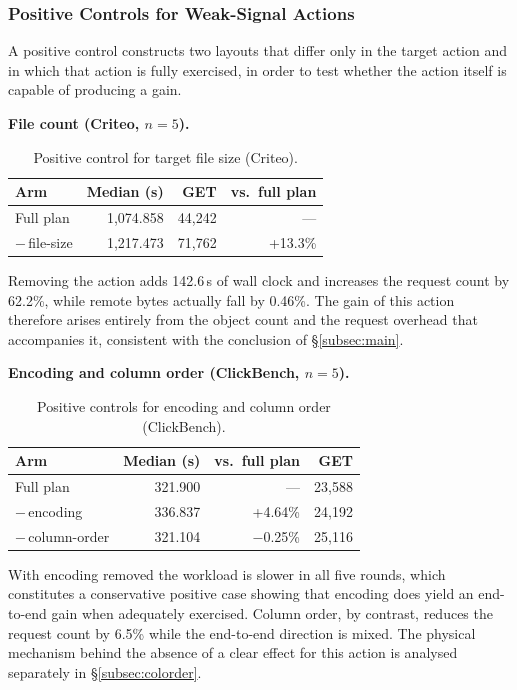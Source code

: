 \subsubsection{Positive Controls for Weak-Signal Actions}
\label{subsec:posctrl}

A positive control constructs two layouts that differ only in the target action
and in which that action is fully exercised, in order to test whether the action
itself is capable of producing a gain.

\textbf{File count (Criteo, $n=5$).}

\begin{table}[t]
\centering
\caption{Positive control for target file size (Criteo).}
\label{tab:posctrl_file}
\footnotesize
\begin{tabular}{@{}lrrr@{}}
\toprule
Arm & Median (s) & GET & vs.\ full plan \\
\midrule
Full plan          & 1{,}074.858 & 44{,}242 & ---      \\
$-$\,file-size     & 1{,}217.473 & 71{,}762 & +13.3\%  \\
\bottomrule
\end{tabular}
\end{table}

Removing the action adds 142.6\,s of wall clock and increases the request count
by 62.2\%, while remote bytes actually fall by 0.46\%. The gain of this action
therefore arises entirely from the object count and the request overhead that
accompanies it, consistent with the conclusion of \S\ref{subsec:main}.

\textbf{Encoding and column order (ClickBench, $n=5$).}

\begin{table}[t]
\centering
\caption{Positive controls for encoding and column order (ClickBench).}
\label{tab:posctrl_cb}
\footnotesize
\begin{tabular}{@{}lrrr@{}}
\toprule
Arm & Median (s) & vs.\ full plan & GET \\
\midrule
Full plan           & 321.900 & ---        & 23{,}588 \\
$-$\,encoding       & 336.837 & +4.64\%    & 24{,}192 \\
$-$\,column-order   & 321.104 & $-$0.25\%  & 25{,}116 \\
\bottomrule
\end{tabular}
\end{table}

With encoding removed the workload is slower in all five rounds, which
constitutes a conservative positive case showing that encoding does yield an
end-to-end gain when adequately exercised. Column order, by contrast, reduces the
request count by 6.5\% while the end-to-end direction is mixed. The physical
mechanism behind the absence of a clear effect for this action is analysed
separately in \S\ref{subsec:colorder}.

